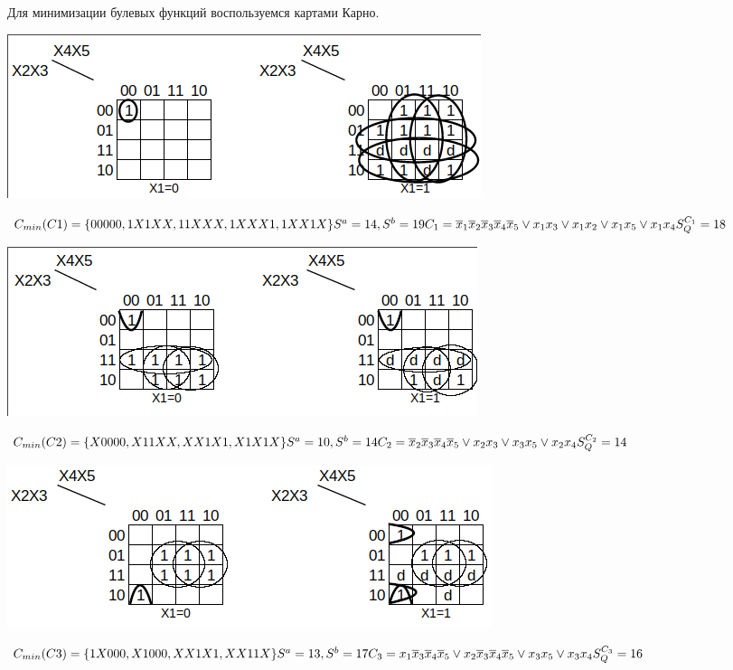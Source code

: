 
Для минимизации булевых функций воспользуемся картами Карно. 

\begin{center}
  \includegraphics[width=\linewidth]{imgs/part2/carno_C1.png}
\end{center}
$C_{min}(C1)=\{00000, 1X1XX, 11XXX, 1XXX1, 1XX1X\} \\
S^a=14, S^b=19 \\
C_1 = \overline{x}_{1}\overline{x}_{2}\overline{x}_{3}\overline{x}_{4}\overline{x}_{5}\vee x_{1}x_{3}\vee x_{1}x_{2}\vee x_{1}x_{5}\vee x_{1}x_{4} \\
S^{C_1}_Q = 18
$

\begin{center}
  \includegraphics[width=\linewidth]{imgs/part2/carno_C2.png}
\end{center}
$C_{min}(C2)=\{X0000, X11XX, XX1X1, X1X1X\} \\
S^a=10, S^b=14 \\
C_2 = \overline{x}_{2}\overline{x}_{3}\overline{x}_{4}\overline{x}_{5}\vee x_{2}x_{3}\vee x_{3}x_{5}\vee x_{2}x_{4} \\
S^{C_2}_Q = 14
$

\begin{center}
  \includegraphics[width=\linewidth]{imgs/part2/carno_C3.png}
\end{center}
$C_{min}(C3)=\{1X000, X1000, XX1X1, XX11X\} \\
S^a=13, S^b=17 \\
C_3 = x_{1}\overline{x}_{3}\overline{x}_{4}\overline{x}_{5}\vee x_{2}\overline{x}_{3}\overline{x}_{4}\overline{x}_{5}\vee x_{3}x_{5}\vee x_{3}x_{4} \\
S^{C_3}_Q = 16
$

